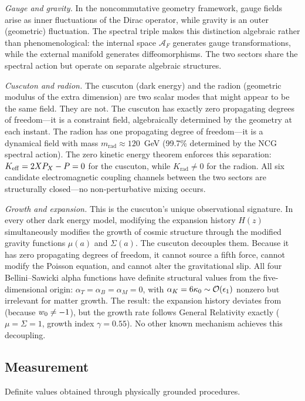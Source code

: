 \textit{Gauge and gravity.} In the noncommutative geometry framework,
gauge fields arise as inner fluctuations of the Dirac operator, while
gravity is an outer (geometric) fluctuation. The spectral triple makes
this distinction algebraic rather than phenomenological: the internal
space $\mathcal{A}_F$ generates gauge transformations, while the
external manifold generates diffeomorphisms. The two sectors share the
spectral action but operate on separate algebraic structures.

\textit{Cuscuton and radion.} The cuscuton (dark energy) and the radion
(geometric modulus of the extra dimension) are two scalar modes that
might appear to be the same field. They are not. The cuscuton has
exactly zero propagating degrees of freedom---it is a constraint field,
algebraically determined by the geometry at each instant. The radion
has one propagating degree of freedom---it is a dynamical field with
mass $m_{\mathrm{rad}} \approx 120$~GeV (99.7\% determined by the NCG
spectral action). The zero kinetic energy theorem enforces this
separation: $K_{\mathrm{eff}} = 2XP_X - P = 0$ for the cuscuton, while
$K_{\mathrm{rad}} \neq 0$ for the radion. All six candidate
electromagnetic coupling channels between the two sectors are
structurally closed---no non-perturbative mixing occurs.

\textit{Growth and expansion.} This is the cuscuton's unique
observational signature. In every other dark energy model, modifying
the expansion history $H(z)$ simultaneously modifies the growth of
cosmic structure through the modified gravity functions $\mu(a)$ and
$\Sigma(a)$. The cuscuton decouples them. Because it has zero
propagating degrees of freedom, it cannot source a fifth force, cannot
modify the Poisson equation, and cannot alter the gravitational slip.
All four Bellini--Sawicki alpha functions have definite structural
values from the five-dimensional origin:
$\alpha_T = \alpha_B = \alpha_M = 0$, with
$\alpha_K = 6\kappa_0 \sim \mathcal{O}\!\left(\epsilon_1\right)$ nonzero but irrelevant for
matter growth. The result: the expansion history deviates from
\LCDM{} (because $w_0 \neq -1$), but the growth rate follows General
Relativity exactly ($\mu = \Sigma = 1$, growth index $\gamma = 0.55$).
No other known mechanism achieves this decoupling.

\subsection{Measurement}
\label{sec:0-measurement}

Definite values obtained through physically grounded procedures.

